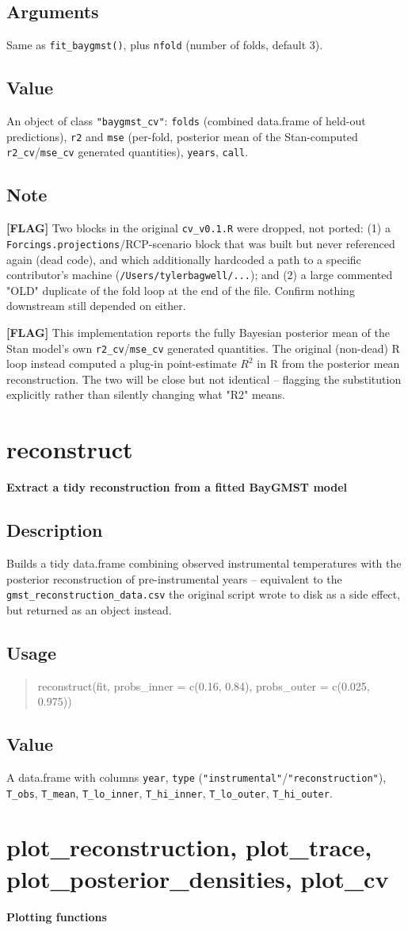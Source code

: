 \documentclass[10pt]{article}
\newcommand{\flag}[1]{\textcolor{gaporange}{\textbf{[FLAG]} #1}}
\newcommand{\rdtopic}[1]{\clearpage\section{#1}}
\newcommand{\rdsub}[1]{\subsection*{#1}}
\newenvironment{rdusage}{\begin{quote}\ttfamily\small}{\end{quote}}
\begin{document}
\rdsub{Arguments}
Same as \texttt{fit\_baygmst()}, plus \texttt{nfold} (number of folds,
default 3).

\rdsub{Value}
An object of class \texttt{"baygmst\_cv"}: \texttt{folds} (combined
data.frame of held-out predictions), \texttt{r2} and \texttt{mse}
(per-fold, posterior mean of the Stan-computed \texttt{r2\_cv}/\texttt{mse\_cv}
generated quantities), \texttt{years}, \texttt{call}.

\rdsub{Note}
\flag{Two blocks in the original \texttt{cv\_v0.1.R} were dropped, not
ported: (1) a \texttt{Forcings.projections}/RCP-scenario block that was
built but never referenced again (dead code), and which additionally
hardcoded a path to a specific contributor's machine
(\texttt{/Users/tylerbagwell/...}); and (2) a large commented "OLD"
duplicate of the fold loop at the end of the file. Confirm nothing
downstream still depended on either.}

\flag{This implementation reports the fully Bayesian posterior mean of the
Stan model's own \texttt{r2\_cv}/\texttt{mse\_cv} generated quantities. The
original (non-dead) R loop instead computed a plug-in point-estimate
$R^2$ in R from the posterior mean reconstruction. The two will be close
but not identical -- flagging the substitution explicitly rather than
silently changing what "R2" means.}

\rdtopic{reconstruct}
\textbf{Extract a tidy reconstruction from a fitted BayGMST model}

\rdsub{Description}
Builds a tidy data.frame combining observed instrumental temperatures with
the posterior reconstruction of pre-instrumental years -- equivalent to the
\texttt{gmst\_reconstruction\_data.csv} the original script wrote to disk as
a side effect, but returned as an object instead.

\rdsub{Usage}
\begin{rdusage}
reconstruct(fit, probs\_inner = c(0.16, 0.84), probs\_outer = c(0.025, 0.975))
\end{rdusage}

\rdsub{Value}
A data.frame with columns \texttt{year}, \texttt{type}
(\texttt{"instrumental"}/\texttt{"reconstruction"}), \texttt{T\_obs},
\texttt{T\_mean}, \texttt{T\_lo\_inner}, \texttt{T\_hi\_inner},
\texttt{T\_lo\_outer}, \texttt{T\_hi\_outer}.

\rdtopic{plot\_reconstruction, plot\_trace, plot\_posterior\_densities, plot\_cv}
\textbf{Plotting functions}
\end{document}
